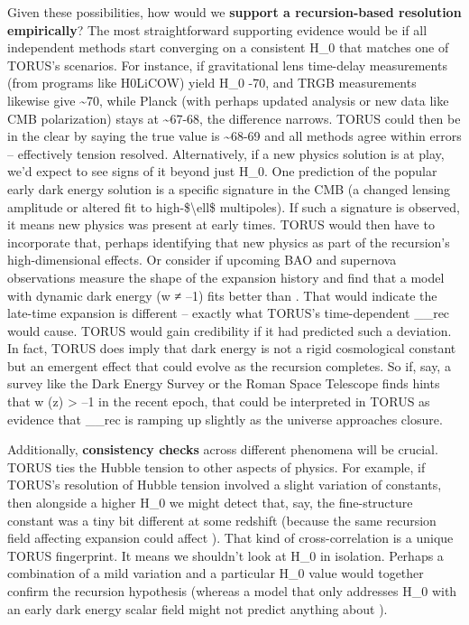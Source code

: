 \documentclass[
]{article}
\begin{document}
{Given these possibilities, how would we \textbf{support a
recursion-based resolution empirically}? The most straightforward
supporting evidence would be if all independent methods start converging
on a consistent H_{0}{}
that matches one of TORUS's scenarios. For instance, if gravitational
lens time-delay measurements (from programs like H0LiCOW) yield
H_{0}{} -70, and TRGB
measurements likewise give \textasciitilde70, while Planck (with perhaps
updated analysis or new data like CMB polarization) stays at
\textasciitilde67-68, the difference narrows. TORUS could then be in the
clear by saying the true value is \textasciitilde68-69 and all methods
agree within errors -- effectively tension resolved. Alternatively, if a
new physics solution is at play, we'd expect to see signs of it beyond
just H_{0}. One
prediction of the popular early dark energy solution is a specific
signature in the CMB (a changed lensing amplitude or altered fit to
high-\$\textbackslash ell\$ multipoles). If such a signature is
observed, it means new physics was present at early times. TORUS would
then have to incorporate that, perhaps identifying that new physics as
part of the recursion's high-dimensional effects. Or consider if
upcoming BAO and supernova observations measure the shape of the
expansion history and find that a model with dynamic dark energy (w ≠
--1) fits better than \LambdaCDM. That would indicate the late-time expansion
is different -- exactly what TORUS's time-dependent
\Lambda\__{rec}{} would cause.
TORUS would gain credibility if it had predicted such a deviation. In
fact, TORUS does imply that dark energy is not a rigid cosmological
constant but an emergent effect that could evolve as the recursion
completes\hspace{0pt}. So if, say, a survey like the Dark Energy Survey
or the Roman Space Telescope finds hints that w (z) \textgreater{} --1
in the recent epoch, that could be interpreted in TORUS as evidence that
\Lambda\__{rec}{} is ramping
up slightly as the universe approaches closure.

Additionally, \textbf{consistency checks} across different phenomena
will be crucial. TORUS ties the Hubble tension to other aspects of
physics. For example, if TORUS's resolution of Hubble tension involved a
slight variation of constants, then alongside a higher
H_{0}{} we might detect
that, say, the fine-structure constant was a tiny bit different at some
redshift (because the same recursion field affecting expansion could
affect \alpha). That kind of cross-correlation is a unique TORUS fingerprint.
It means we shouldn't look at
H_{0}{} in isolation.
Perhaps a combination of a mild \alpha variation and a particular
H_{0}{} value would
together confirm the recursion hypothesis (whereas a model that only
addresses H_{0}{} with an
early dark energy scalar field might not predict anything about \alpha).

}
\end{document}
